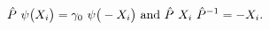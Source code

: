\begin{equation}
{\hat P}~ \psi\big(X_i \big) = \gamma_0~ \psi \big( - X_i \big)\
{\rm and}\ {\hat P}~ X_i~ {\hat P}^{-1} = - X_i. 
\end{equation}

